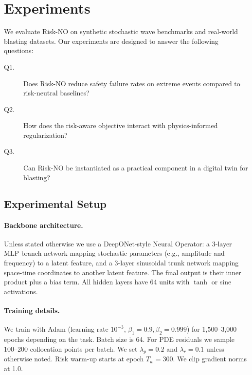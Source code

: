\documentclass{article}
\theoremstyle{plain}
\theoremstyle{definition}
\theoremstyle{remark}
\begin{document}
\section{Experiments}
\label{sec:experiments}

We evaluate Risk-NO on synthetic stochastic wave benchmarks and real-world blasting datasets. Our experiments are designed to answer the following questions:

\begin{description}
    \item[Q1.] Does Risk-NO reduce safety failure rates on extreme events compared to risk-neutral baselines?
    \item[Q2.] How does the risk-aware objective interact with physics-informed regularization?
    \item[Q3.] Can Risk-NO be instantiated as a practical component in a digital twin for blasting?
\end{description}

\subsection{Experimental Setup}

\paragraph{Backbone architecture.}
Unless stated otherwise we use a DeepONet-style Neural Operator: a 3-layer MLP branch network mapping stochastic parameters (e.g., amplitude and frequency) to a latent feature, and a 3-layer sinusoidal trunk network mapping space-time coordinates to another latent feature. The final output is their inner product plus a bias term. All hidden layers have 64 units with $\tanh$ or sine activations.

\paragraph{Training details.}
We train with Adam (learning rate $10^{-3}$, $\beta_1=0.9,\beta_2=0.999$) for 1,500--3,000 epochs depending on the task. Batch size is 64. For PDE residuals we sample 100--200 collocation points per batch. We set $\lambda_p=0.2$ and $\lambda_r=0.1$ unless otherwise noted. Risk warm-up starts at epoch $T_w=300$. We clip gradient norms at 1.0.
\end{document}
